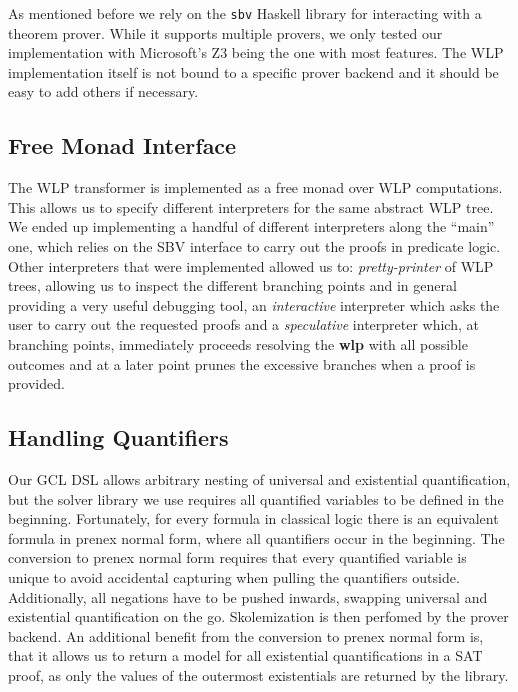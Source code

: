 \documentclass[]{scrartcl}
\begin{document}
As mentioned before we rely on the \texttt{sbv} Haskell library for interacting with a theorem prover.
While it supports multiple provers, we only tested our implementation with Microsoft's Z3 being the
one with most features.
The WLP implementation itself is not bound to a specific prover backend and it should be easy to
add others if necessary.

\subsection{Free Monad Interface}

The WLP transformer is implemented as a free monad over WLP computations.
This allows us to specify different interpreters for the same abstract WLP tree.
We ended up implementing a handful of different interpreters along the ``main''
one, which relies on the SBV interface to carry out the proofs in predicate logic.
Other interpreters that were implemented allowed us to: \textit{pretty-printer} of WLP trees,
allowing us to inspect the different branching points and in general providing
a very useful debugging tool, an \textit{interactive} interpreter which asks the user
to carry out the requested proofs and a \textit{speculative} interpreter which, at branching
points, immediately proceeds resolving the \textbf{wlp} with all possible outcomes and
at a later point prunes the excessive branches when a proof is provided.

\subsection{Handling Quantifiers}

Our GCL DSL allows arbitrary nesting of universal and existential quantification,
but the solver library we use requires all quantified variables to be defined in
the beginning.
Fortunately, for every formula in classical logic there is an equivalent formula
in prenex normal form, where all quantifiers occur in the beginning.
The conversion to prenex normal form requires that every quantified variable is
unique to avoid accidental capturing when pulling the quantifiers outside.
Additionally, all negations have to be pushed inwards, swapping universal and
existential quantification on the go.
Skolemization is then perfomed by the prover backend.
An additional benefit from the conversion to prenex normal form is, that it allows
us to return a model for all existential quantifications in a SAT proof, as only
the values of the outermost existentials are returned by the library.
\end{document}

